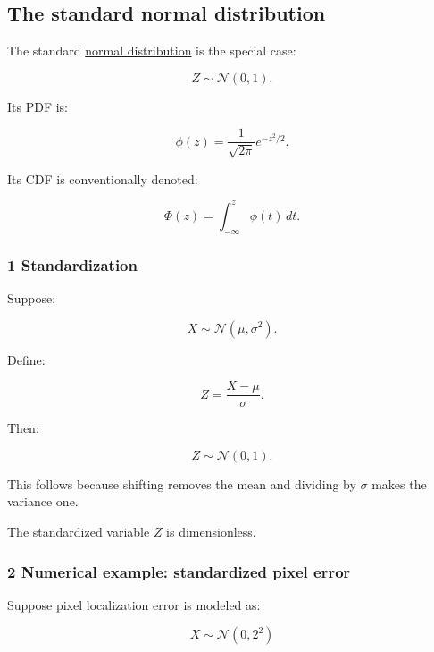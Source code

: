 \subsection{The standard normal distribution}\label{02-foundations-ii-ch023-the-standard-normal-distribution}

\hypertarget{02-foundations-ii-ch023-the-standard-normal-distribution}{}

The standard \hyperref[02-foundations-ii-ch023-discrete-and-continuous-distribution-families]{normal distribution} is the special case:

\[
 \boxed{Z\sim\mathcal N(0,1)}.
\]

Its PDF is:

\[
 \boxed{ \phi(z)= \frac1{\sqrt{2\pi}}e^{-z^2/2} }.
\]

Its CDF is conventionally denoted:

\[
 \boxed{ \Phi(z)= \int_{-\infty}^{z}\phi(t)\,dt }.
\]

\subsubsection{1 Standardization}\label{02-foundations-ii-ch023-standardization}

\hypertarget{02-foundations-ii-ch023-standardization}{}

Suppose:

\[
 X\sim\mathcal N(\mu,\sigma^2).
\]

Define:

\[
 \boxed{ Z=\frac{X-\mu}{\sigma} }.
\]

Then:

\[
 Z\sim\mathcal N(0,1).
\]

This follows because shifting removes the mean and dividing by \(\sigma\) makes the variance one.

The standardized variable \(Z\) is dimensionless.

\subsubsection{2 Numerical example: standardized pixel error}\label{02-foundations-ii-ch023-numerical-example-standardized-pixel-error}

\hypertarget{02-foundations-ii-ch023-numerical-example-standardized-pixel-error}{}

Suppose pixel localization error is modeled as:

\[
 X\sim\mathcal N(0,2^2)
\]

